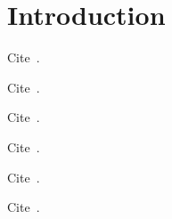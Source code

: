 \section{Introduction}\label{sec:introduction}

Cite~\cite{DziembowskiFKP15}.

Cite~\cite{AtenieseBFG14}.

Cite~\cite{TangZDWLG0L19}.

Cite~\cite{RenD16}.

Cite~\cite{ParkKFGAP18}.

Cite~\cite{Reyzin23}.

